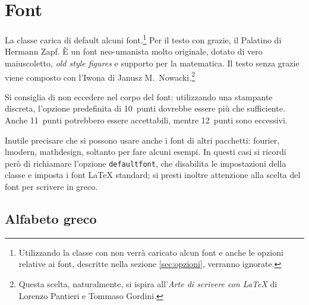 \documentclass{suftesi}
\newcommand*{\option}{\texttt}
\newcommand{\pack}{\textsf}
\begin{document}
\section{Font}
 
La classe carica di default alcuni font.\footnote{Utilizzando la classe con \XeLaTeX{} non verrà caricato alcun font e anche le opzioni relative ai font, descritte nella sezione \ref{sec:opzioni}, verranno ignorate.}  Per il testo con grazie, il
Palatino di Hermann Zapf.  
È un font neo-umanista molto originale, 
dotato di vero maiuscoletto, \emph{old style figures} e supporto per
la matematica. Il testo senza grazie viene composto con l'Iwona di
Janusz M.~Nowacki.\footnote{Questa scelta, naturalmente, si ispira  all'\emph{Arte di scrivere con \LaTeX{}} di Lorenzo Pantieri e Tommaso Gordini.}


Si consiglia di non eccedere nel corpo del font: utilizzando una
stampante discreta, l'opzione predefinita di 10~punti dovrebbe essere
più che sufficiente. Anche 11~punti potrebbero essere accettabili,
mentre 12~punti sono eccessivi.

Inutile precisare che si possono usare anche i font di altri
pacchetti: \pack{fourier}, \pack{lmodern}, \pack{mathdesign}, soltanto
per fare alcuni esempi. In questi casi si ricordi però di richiamare l'opzione \option{defaultfont}, che disabilita le impostazioni della classe e imposta i font \LaTeX{} standard; si presti inoltre attenzione alla scelta del font per scrivere in greco. 

\subsection{Alfabeto greco}
\end{document}
